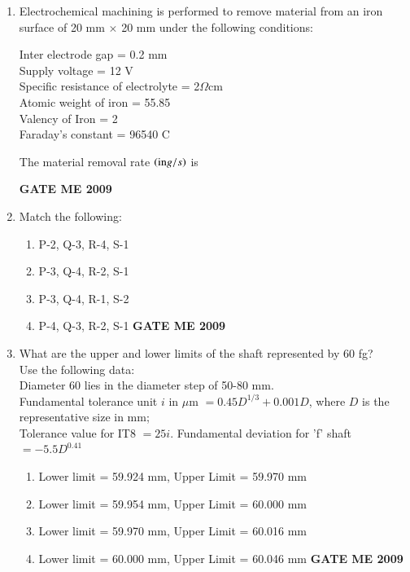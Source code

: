 \documentclass[journal]{IEEEtran}
\begin{document}
\begin{enumerate}[leftmargin=0pt]
\item Electrochemical machining is performed to remove material from an iron surface of 20 mm $\times$ 20 mm under the following conditions: 
\begin{center}
    Inter electrode gap = 0.2 mm\\
    Supply voltage = 12 V\\
    Specific resistance of electrolyte = 2$\Omega$cm\\
    Atomic weight of iron = 55.85\\
    Valency of Iron = 2\\
    Faraday's constant = 96540 C\\
\end{center}
The material removal rate $\left(\text{in} g/s\right)$ is
\begin{enumerate}
\hfill{\textbf{GATE ME 2009}}
\end{enumerate}

\item Match the following:\\
\begin{table}[h]
    \centering
    
    
\end{table}
\begin{enumerate}
  \item P-2, Q-3, R-4, S-1
  \item P-3, Q-4, R-2, S-1
  \item P-3, Q-4, R-1, S-2
  \item P-4, Q-3, R-2, S-1
\hfill{\textbf{GATE ME 2009}}
\end{enumerate}

\item What are the upper and lower limits of the shaft represented by 60 fg?\\ Use the following data:
\\ Diameter 60 lies in the diameter step of 50-80 mm. \\
Fundamental tolerance unit $i$ in $\mu$m $= 0.45 D^{1/3} + 0.001 D$, where $D$ is the representative size in mm; \\
Tolerance value for IT8 $= 25i$. Fundamental deviation for 'f' shaft $= -5.5 D^{0.41}$
\begin{enumerate}
  \item Lower limit = 59.924 mm, Upper Limit = 59.970 mm
  \item Lower limit = 59.954 mm, Upper Limit = 60.000 mm
  \item Lower limit = 59.970 mm, Upper Limit = 60.016 mm
  \item Lower limit = 60.000 mm, Upper Limit = 60.046 mm
\hfill{\textbf{GATE ME 2009}}
\end{enumerate}


\end{enumerate}
\end{document}

